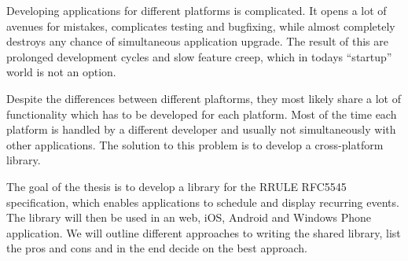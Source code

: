 \begin{Abstract}

Developing applications for different platforms is complicated. It opens a lot of avenues for mistakes, complicates testing and bugfixing, while almost completely destroys any chance of simultaneous application upgrade. The result of this are prolonged development cycles and slow feature creep, which in todays ``startup'' world is not an option.

Despite the differences between different plaftorms, they most likely share a lot of functionality which has to be developed for each platform. Most of the time each platform is handled by a different developer and usually not simultaneously with other applications. The solution to this problem is to develop a cross-platform library.

The goal of the thesis is to develop a library for the RRULE RFC5545 specification, which enables applications to schedule and display recurring events. The library will then be used in an web, iOS, Android and Windows Phone application. We will outline different approaches to writing the shared library, list the pros and cons and in the end decide on the best approach.
\end{Abstract}
